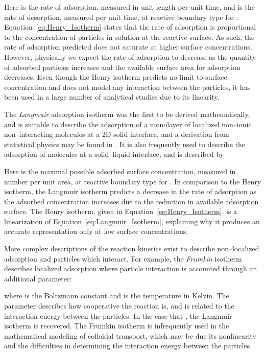 \documentclass[preprint, 1p, authoryear]{elsarticle}
\begin{document}
Here  is the rate of adsorption, measured in unit length per unit time, and  is the rate of desorption, measured per unit time, at reactive boundary type  for .  Equation~\eqref{eq:Henry_Isotherm} states that the rate of adsorption is proportional to the concentration of particles in solution at the reactive surface. As such, the rate of adsorption predicted does not saturate at higher surface concentrations. However, physically we  expect the rate of adsorption to decrease as the quantity of adsorbed particles increases and the available surface area for adsorption decreases.  Even though the Henry isotherm predicts no  limit to surface concentration and does not model any interaction between the particles,  it has been used in a large number of analytical studies  due to its linearity.  
 

The \emph{Langmuir} adsorption isotherm was the first to be derived mathematically, and is suitable to describe the adsorption of a monolayer of  localized non--ionic non--interacting molecules at a 2D solid interface, and a derivation from statistical physics may be found  in \citep{Baret1969Theoretical}.  It is also  frequently used to describe the  adsorption of molecules at a solid--liquid interface, and is described by

Here  is the maximal possible adsorbed surface concentration, measured in number per unit area, at reactive boundary type  for .   In comparison to the Henry isotherm, the Langmuir isotherm predicts a decrease in the rate of adsorption as the adsorbed concentration increases  due to the reduction in available adsorption surface.  The Henry isotherm, given in Equation~\eqref{eq:Henry_Isotherm}, is a linearization of Equation~\eqref{eq:Langmuir_Isotherm}, explaining why it produces an accurate representation only at low surface concentrations.    


More complex descriptions of the reaction kinetics exist to describe non--localized adsorption and particles which interact.  For example, the \emph{Frumkin} isotherm describes localized adsorption where particle interaction is accounted through an additional  parameter:
 
where    is the Boltzmann constant and  is the temperature in Kelvin. The parameter  describes how cooperative the reaction is, and is related to the interaction energy between the  particles. In the case that , the Langmuir isotherm is recovered.    The Frumkin isotherm is infrequently  used in the mathematical modeling of colloidal transport, which may be due its nonlinearity and the difficulties in determining the interaction energy between the particles. 
\end{document}
